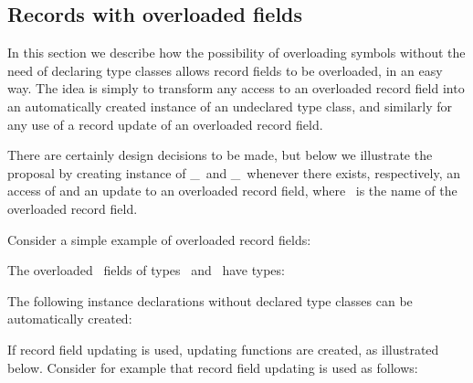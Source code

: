 \subsection{Records with overloaded fields}
\label{sec:overloaded-record-fields}

In this section we describe how the possibility of overloading symbols
without the need of declaring type classes allows record fields to be
overloaded, in an easy way. The idea is simply to transform any access
to an overloaded record field into an automatically created instance
of an undeclared type class, and similarly for any use of a record
update of an overloaded record field. 

There are certainly design decisions to be made, but below we
illustrate the proposal by creating instance of \get\_\fieldname\ and
\update\_\fieldname\ whenever there exists, respectively, an access of
and an update to an overloaded record field, where \fieldname\ is the
name of the overloaded record field.

Consider a simple example of overloaded record fields: 

\progb{\data\ \Address\ \= = \Address\ \= \{ \id\ :: \Int, \aaddress\ \= :: \String\ \= \kill
\data\ \Person\  \> = \Person\  \> \{ \id\ :: \Int, \name\     \> :: \String\ \>\}\\
\data\ \Address\ \> = \Address\ \> \{ \id\ :: \Int, \aaddress\ \> :: \String\ \>\}
}

The overloaded \id\ fields of types \Person\ and \Address\ have types:

\progb{\id\ :: \Address\ \= \kill
\id\ :: \Person\  \>$\rightarrow$ \Int\\
\id\ :: \Address\ \>$\rightarrow$ \Int
}

The following instance declarations without declared type classes can
be automatically created: 

\progb{
\get\_\id\ :: \Person\ $\rightarrow$ \Int\\
\instance\ \get\_\id\ (\Person\ \id\ \_\ )  = \id\\ \\
\get\_\id\ :: \Address\ $\rightarrow$ \Int\\
\instance\ \get\_\id\ (\Address\ \id\ \_\ ) = \id
}

If record field updating is used, updating functions are created, as
illustrated below. Consider for example that record field updating is
used as follows:

\progb{
\update\_\id\ :: \Person\ $\rightarrow$ \Int\ $\rightarrow$ \Person\\
\instance\ \update\_\id\ (\Person\ \id\ \name) \new\_\id\ = \Person\ \new\_\id\ \name\\ \\
\update\_\id\ :: \Address\ $\rightarrow$ \Int\ $\rightarrow$ \Address\\
\instance\ \update\_\id\ (\Address\ \id\ \aaddress) \new\_\id\ = \Address\ \new\_\id\ \aaddress
}

